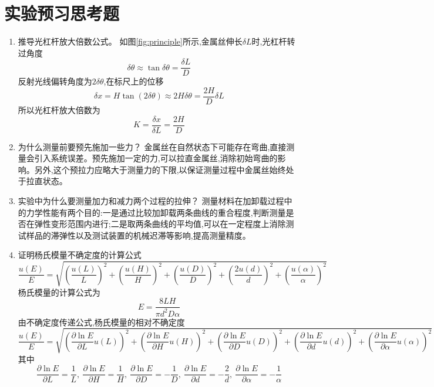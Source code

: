 \documentclass[UTF8]{ctexart}
\begin{document}
\section{实验预习思考题}
\begin{enumerate}
    \item 推导光杠杆放大倍数公式。
    如图\ref{fig:principle}所示,金属丝伸长$\delta L$时,光杠杆转过角度
\begin{equation}
\delta\theta\approx\tan\delta\theta=\frac{\delta L}{D}
\end{equation}
反射光线偏转角度为$2\delta\theta$,在标尺上的位移
\begin{equation}
\delta x=H\tan(2\delta\theta)\approx 2H\delta\theta=\frac{2H}{D}\delta L
\end{equation}
所以光杠杆放大倍数为
\begin{equation}
K=\frac{\delta x}{\delta L}=\frac{2H}{D}
\end{equation}
    \item 为什么测量前要预先施加一些力？
    金属丝在自然状态下可能存在弯曲,直接测量会引入系统误差。预先施加一定的力,可以拉直金属丝,消除初始弯曲的影响。另外,这个预拉力应略大于测量力的下限,以保证测量过程中金属丝始终处于拉直状态。
    \item 实验中为什么要测量加力和减力两个过程的拉伸？
    测量材料在加卸载过程中的力学性能有两个目的:一是通过比较加卸载两条曲线的重合程度,判断测量是否在弹性变形范围内进行;二是取两条曲线的平均值,可以在一定程度上消除测试样品的滞弹性以及测试装置的机械迟滞等影响,提高测量精度。
    \item 证明杨氏模量不确定度的计算公式 \begin{equation} \frac{u(E)}{E}=\sqrt{(\frac{u(L)}{L})^2+(\frac{u(H)}{H})^2+(\frac{u(D)}{D})^2+(\frac{2u(d)}{d})^2+(\frac{u(\alpha)}{\alpha})^2} \end{equation}
    杨氏模量的计算公式为
    \begin{equation}
    E=\frac{8LH}{\pi d^2D\alpha}
    \end{equation}
    由不确定度传递公式,杨氏模量的相对不确定度
    \begin{equation}
    \frac{u(E)}{E}=\sqrt{(\frac{\partial\ln E}{\partial L}u(L))^2+(\frac{\partial\ln E}{\partial H}u(H))^2+(\frac{\partial\ln E}{\partial D}u(D))^2+(\frac{\partial\ln E}{\partial d}u(d))^2+(\frac{\partial\ln E}{\partial \alpha}u(\alpha))^2}
    \end{equation}
    其中
    \begin{equation}
    \frac{\partial\ln E}{\partial L}=\frac{1}{L},\ \frac{\partial\ln E}{\partial H}=\frac{1}{H},\ \frac{\partial\ln E}{\partial D}=-\frac{1}{D},\ \frac{\partial\ln E}{\partial d}=-\frac{2}{d},\ \frac{\partial\ln E}{\partial \alpha}=-\frac{1}{\alpha}

\end{equation}
\end{enumerate}
\end{document}
